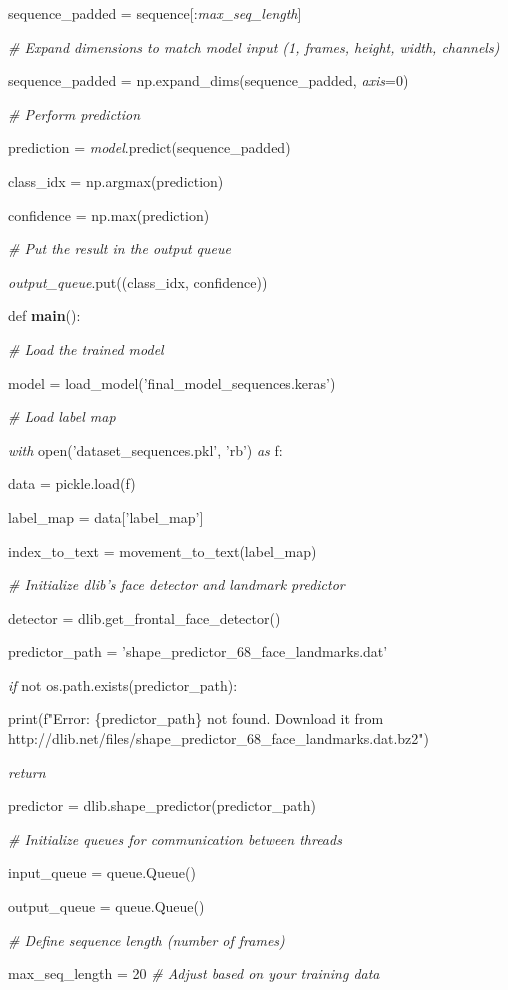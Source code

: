 \documentclass[
]{article}
\begin{document}
sequence\_padded = sequence{[}:\emph{max\_seq\_length}{]}

\emph{\# Expand dimensions to match model input (1, frames, height, width, channels)}

sequence\_padded = np.expand\_dims(sequence\_padded, \emph{axis}=0)

\emph{\# Perform prediction}

prediction = \emph{model}.predict(sequence\_padded)

class\_idx = np.argmax(prediction)

confidence = np.max(prediction)

\emph{\# Put the result in the output queue}

\emph{output\_queue}.put((class\_idx, confidence))

def \textbf{main}():

\emph{\# Load the trained model}

model = load\_model('final\_model\_sequences.keras')

\emph{\# Load label map}

\emph{with} open('dataset\_sequences.pkl', 'rb') \emph{as} f:

data = pickle.load(f)

label\_map = data{[}'label\_map'{]}

index\_to\_text = movement\_to\_text(label\_map)

\emph{\# Initialize dlib's face detector and landmark predictor}

detector = dlib.get\_frontal\_face\_detector()

predictor\_path = 'shape\_predictor\_68\_face\_landmarks.dat'

\emph{if} not os.path.exists(predictor\_path):

print(f"Error: \{predictor\_path\} not found. Download it from http://dlib.net/files/shape\_predictor\_68\_face\_landmarks.dat.bz2")

\emph{return}

predictor = dlib.shape\_predictor(predictor\_path)

\emph{\# Initialize queues for communication between threads}

input\_queue = queue.Queue()

output\_queue = queue.Queue()

\emph{\# Define sequence length (number of frames)}

max\_seq\_length = 20 \emph{\# Adjust based on your training data}
\end{document}
